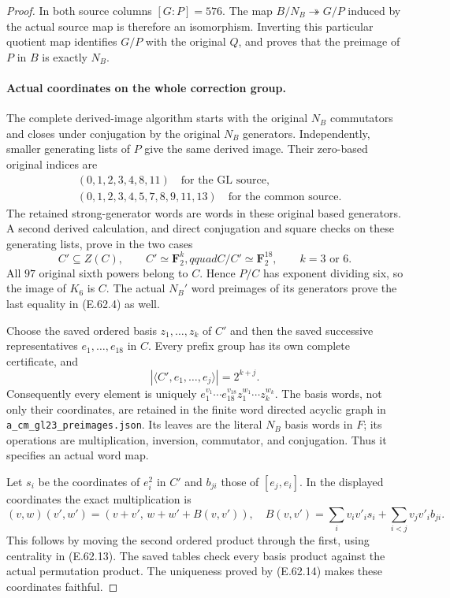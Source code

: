 \begin{proof}
In both source columns $[G:P]=576$.  The map
$B/N_B\twoheadrightarrow G/P$ induced by the actual source map is
therefore an isomorphism.  Inverting this particular quotient map
identifies $G/P$ with the original $Q$, and proves that the preimage
of $P$ in $B$ is exactly $N_B$.

\paragraph{Actual coordinates on the whole correction group.}
The complete derived-image algorithm starts with the original
$N_B$ commutators and closes under conjugation by the original
$N_B$ generators.  Independently, smaller generating lists of $P$
give the same derived image.  Their zero-based original indices are
\[
 \begin{split}
 &(0,1,2,3,4,8,11)\quad\text{for the GL source},\\
 &(0,1,2,3,4,5,7,8,9,11,13)\quad\text{for the common source}.
 \end{split}
 \tag{E.62.12}
\]
The retained strong-generator words are words in these original based
generators.  A second derived calculation, and direct conjugation and
square checks on these generating lists, prove in the two cases
\[
 C'\subseteq Z(C),\qquad C'\simeq\mathbf F_2^k,qquad
 C/C'\simeq\mathbf F_2^{18},\qquad k=3\text{ or }6.
 \tag{E.62.13}
\]
All $97$ original sixth powers belong to $C$.  Hence $P/C$ has exponent
dividing six, so the image of $K_6$ is $C$.  The actual $N_B'$ word
preimages of its generators prove the last equality in
\textup{(E.62.4)} as well.

Choose the saved ordered basis $z_1,\ldots,z_k$ of $C'$ and then the
saved successive representatives $e_1,\ldots,e_{18}$ in $C$.  Every
prefix group has its own complete certificate, and
\[
 |\langle C',e_1,\ldots,e_j\rangle|=2^{k+j}.
 \tag{E.62.14}
\]
Consequently every element is uniquely
$e_1^{v_1}\cdots e_{18}^{v_{18}}z_1^{w_1}\cdots z_k^{w_k}$.
The basis words, not only their coordinates, are retained in the
finite word directed acyclic graph in
\texttt{a\_cm\_gl23\_preimages.json}.  Its leaves are the literal
$N_B$ basis words in $F$; its operations are multiplication, inversion,
commutator, and conjugation.  Thus it specifies an actual word map.

Let $s_i$ be the coordinates of $e_i^2$ in $C'$ and $b_{ji}$ those of
$[e_j,e_i]$.  In the displayed coordinates the exact multiplication is
\[
 (v,w)(v',w')=(v+v',\,w+w'+B(v,v')),
 \quad
 B(v,v')=\sum_i v_iv'_i s_i+\sum_{i<j}v_jv'_i b_{ji}.
 \tag{E.62.15}
\]
This follows by moving the second ordered product through the first,
using centrality in \textup{(E.62.13)}.  The saved tables check every
basis product against the actual permutation product.  The uniqueness
proved by \textup{(E.62.14)} makes these coordinates faithful.


\end{proof}
